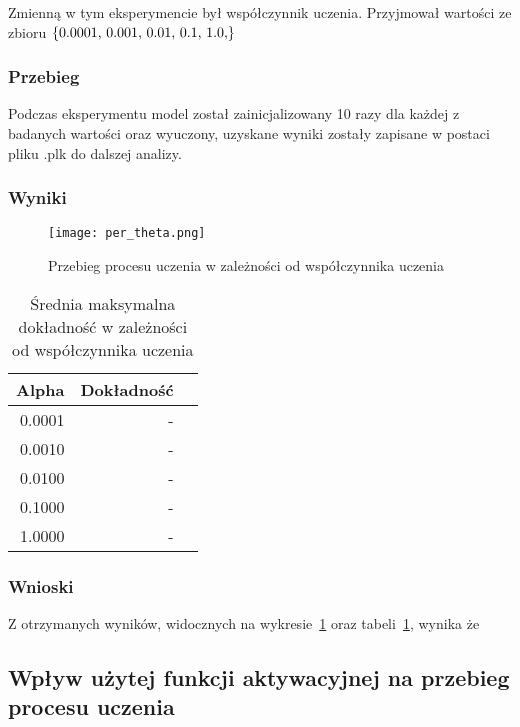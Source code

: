 \documentclass{article}
\begin{document}
Zmienną w tym eksperymencie był współczynnik uczenia. Przyjmował wartości ze zbioru \(\{$0.0001, 0.001, 0.01, 0.1, 1.0,$\}\)
\subsubsection*{Przebieg}

Podczas eksperymentu model został zainicjalizowany 10 razy dla każdej z badanych wartości oraz wyuczony, uzyskane wyniki zostały zapisane w postaci pliku .plk do dalszej analizy.

\subsubsection*{Wyniki}
\begin{figure}[!h]
	\centering
	\caption{Przebieg procesu uczenia w zależności od współczynnika uczenia}
	\texttt{[image: per\_theta.png]}
	\label{fig:res41}
\end{figure}

\begin{table}[!h]
	\caption{Średnia maksymalna dokładność w zależności od współczynnika uczenia}
	\label{tabela-res-41}
	\centering
	\begin{tabular}{rrr}
		\toprule
		Alpha  & Dokładność \\
		\midrule
		0.0001 & -             \\
		0.0010 & -             \\
		0.0100 & -             \\
		0.1000 & -             \\
		1.0000 & -             \\
		\bottomrule
	\end{tabular}
\end{table}

\subsubsection*{Wnioski}

Z otrzymanych wyników, widocznych na wykresie~\ref{fig:res41} oraz tabeli~\ref{tabela-res-41}, wynika że

\newpage
\subsection{Wpływ użytej funkcji aktywacyjnej na przebieg procesu uczenia}
\end{document}
